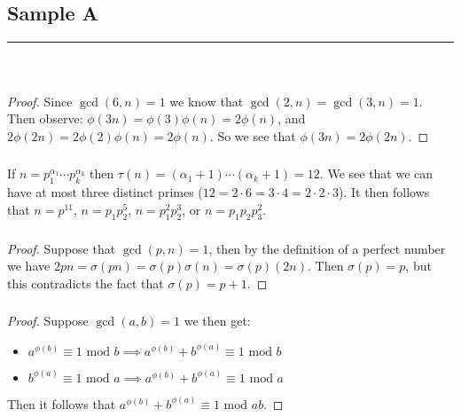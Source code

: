 \documentclass[class=article, crop=false]{standalone}
\begin{document}
\setcounter{subsection}{1}
\subsection{Sample A}
\rule{\textwidth}{1pt}\\
\subsubsection{}
\subsubsection{}
\begin{proof}
	Since $\gcd(6,n)=1$ we know that $\gcd(2,n)=\gcd(3,n)=1$.
	Then observe:
	$\phi(3n) = \phi(3)\phi(n) = 2 \phi(n)$, and
	$2\phi(2n) = 2\phi(2)\phi(n) = 2\phi(n)$.
	So we see that $\phi(3n) = 2\phi(2n)$.
\end{proof}
\subsubsection{}
If $n=p_1^{\alpha_1}\cdots p_k^{\alpha_k}$ then $\tau(n) = (\alpha_1 +1) \cdots (\alpha_k +1)=12$.
We see that we can have at most three distinct primes ($12 = 2\cdot 6 = 3\cdot 4 = 2\cdot 2 \cdot 3$).
It then follows that $n=p^{11}$, $n=p_1 p_2^{5}$, $n=p_1^{2} p_2^{3}$, or $n=p_1 p_2 p_3^{2}$.
\subsubsection{}
\begin{proof}
	Suppose that $\gcd(p,n)=1$, then by the definition of a perfect number
	we have $2pn = \sigma(pn)= \sigma(p)\sigma(n) = \sigma(p) (2n)$.
	Then $\sigma(p) = p$, but this contradicts the fact that $\sigma(p)=p+1$.
\end{proof}
\subsubsection{}
\begin{proof}
	Suppose $\gcd(a,b) = 1$ we then get:
	\begin{itemize}
		\item $a^{\phi(b)} \equiv 1 \mbox{ mod } b \implies a^{\phi(b)} + b^{\phi(a)} \equiv 1\mbox{ mod } b$
		\item $b^{\phi(a)} \equiv 1 \mbox{ mod } a \implies a^{\phi(b)} + b^{\phi(a)} \equiv 1\mbox{ mod } a$
	\end{itemize}
	Then it follows that $a^{\phi(b)} + b^{\phi(a)} \equiv 1\mbox{ mod }ab$.
\end{proof}
\end{document}
